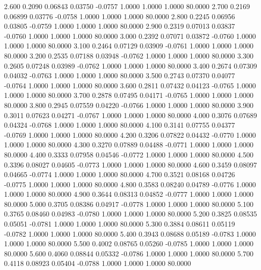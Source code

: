   2.600   0.2090   0.06843   0.03750  -0.0757   1.0000   1.0000   1.0000  80.0000
   2.700   0.2169   0.06899   0.03776  -0.0758   1.0000   1.0000   1.0000  80.0000
   2.800   0.2245   0.06956   0.03805  -0.0759   1.0000   1.0000   1.0000  80.0000
   2.900   0.2319   0.07013   0.03837  -0.0760   1.0000   1.0000   1.0000  80.0000
   3.000   0.2392   0.07071   0.03872  -0.0760   1.0000   1.0000   1.0000  80.0000
   3.100   0.2464   0.07129   0.03909  -0.0761   1.0000   1.0000   1.0000  80.0000
   3.200   0.2535   0.07188   0.03948  -0.0762   1.0000   1.0000   1.0000  80.0000
   3.300   0.2605   0.07248   0.03989  -0.0762   1.0000   1.0000   1.0000  80.0000
   3.400   0.2674   0.07309   0.04032  -0.0763   1.0000   1.0000   1.0000  80.0000
   3.500   0.2743   0.07370   0.04077  -0.0764   1.0000   1.0000   1.0000  80.0000
   3.600   0.2811   0.07432   0.04123  -0.0765   1.0000   1.0000   1.0000  80.0000
   3.700   0.2878   0.07495   0.04171  -0.0765   1.0000   1.0000   1.0000  80.0000
   3.800   0.2945   0.07559   0.04220  -0.0766   1.0000   1.0000   1.0000  80.0000
   3.900   0.3011   0.07623   0.04271  -0.0767   1.0000   1.0000   1.0000  80.0000
   4.000   0.3076   0.07689   0.04324  -0.0768   1.0000   1.0000   1.0000  80.0000
   4.100   0.3141   0.07755   0.04377  -0.0769   1.0000   1.0000   1.0000  80.0000
   4.200   0.3206   0.07822   0.04432  -0.0770   1.0000   1.0000   1.0000  80.0000
   4.300   0.3270   0.07889   0.04488  -0.0771   1.0000   1.0000   1.0000  80.0000
   4.400   0.3333   0.07958   0.04546  -0.0772   1.0000   1.0000   1.0000  80.0000
   4.500   0.3396   0.08027   0.04605  -0.0773   1.0000   1.0000   1.0000  80.0000
   4.600   0.3459   0.08097   0.04665  -0.0774   1.0000   1.0000   1.0000  80.0000
   4.700   0.3521   0.08168   0.04726  -0.0775   1.0000   1.0000   1.0000  80.0000
   4.800   0.3583   0.08240   0.04789  -0.0776   1.0000   1.0000   1.0000  80.0000
   4.900   0.3644   0.08313   0.04852  -0.0777   1.0000   1.0000   1.0000  80.0000
   5.000   0.3705   0.08386   0.04917  -0.0778   1.0000   1.0000   1.0000  80.0000
   5.100   0.3765   0.08460   0.04983  -0.0780   1.0000   1.0000   1.0000  80.0000
   5.200   0.3825   0.08535   0.05051  -0.0781   1.0000   1.0000   1.0000  80.0000
   5.300   0.3884   0.08611   0.05119  -0.0782   1.0000   1.0000   1.0000  80.0000
   5.400   0.3943   0.08688   0.05189  -0.0783   1.0000   1.0000   1.0000  80.0000
   5.500   0.4002   0.08765   0.05260  -0.0785   1.0000   1.0000   1.0000  80.0000
   5.600   0.4060   0.08844   0.05332  -0.0786   1.0000   1.0000   1.0000  80.0000
   5.700   0.4118   0.08923   0.05404  -0.0788   1.0000   1.0000   1.0000  80.0000
